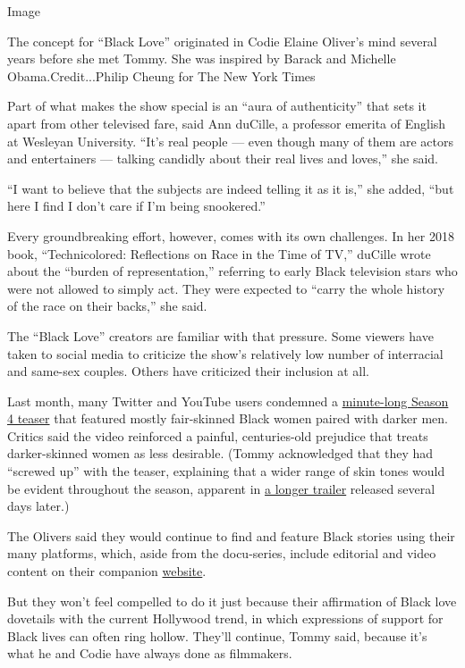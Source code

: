 Image

The concept for ``Black Love'' originated in Codie Elaine Oliver's mind
several years before she met Tommy. She was inspired by Barack and
Michelle Obama.Credit...Philip Cheung for The New York Times

Part of what makes the show special is an ``aura of authenticity'' that
sets it apart from other televised fare, said Ann duCille, a professor
emerita of English at Wesleyan University. ``It's real people --- even
though many of them are actors and entertainers --- talking candidly
about their real lives and loves,'' she said.

``I want to believe that the subjects are indeed telling it as it is,''
she added, ``but here I find I don't care if I'm being snookered.''

Every groundbreaking effort, however, comes with its own challenges. In
her 2018 book, ``Technicolored: Reflections on Race in the Time of TV,''
duCille wrote about the ``burden of representation,'' referring to early
Black television stars who were not allowed to simply act. They were
expected to ``carry the whole history of the race on their backs,'' she
said.

The ``Black Love'' creators are familiar with that pressure. Some
viewers have taken to social media to criticize the show's relatively
low number of interracial and same-sex couples. Others have criticized
their inclusion at all.

Last month, many Twitter and YouTube users condemned a
\href{https://www.youtube.com/watch?v=KLkUpZmVHPE}{minute-long Season 4
teaser} that featured mostly fair-skinned Black women paired with darker
men. Critics said the video reinforced a painful, centuries-old
prejudice that treats darker-skinned women as less desirable. (Tommy
acknowledged that they had ``screwed up'' with the teaser, explaining
that a wider range of skin tones would be evident throughout the season,
apparent in \href{https://www.youtube.com/watch?v=O7iivDmUI4w}{a longer
trailer} released several days later.)

The Olivers said they would continue to find and feature Black stories
using their many platforms, which, aside from the docu-series, include
editorial and video content on their companion
\href{https://blacklove.com/}{website}.

But they won't feel compelled to do it just because their affirmation of
Black love dovetails with the current Hollywood trend, in which
expressions of support for Black lives can often ring hollow. They'll
continue, Tommy said, because it's what he and Codie have always done as
filmmakers.

